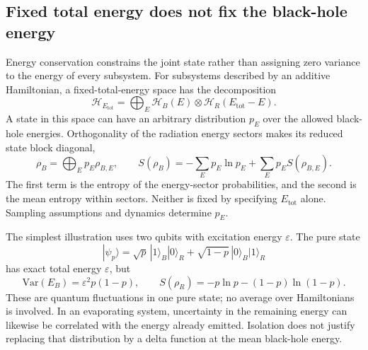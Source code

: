 \documentclass[11pt,letterpaper]{article}
\theoremstyle{plain}
\theoremstyle{definition}
\theoremstyle{remark}
\newcommand{\Hcal}{\mathcal{H}}
\newcommand{\Var}{\text{Var}}
\begin{document}
\subsection{Fixed total energy does not fix the black-hole energy}
\label{subsec14:energy_constraints}

Energy conservation constrains the joint state rather than assigning
zero variance to the energy of every subsystem. For subsystems described
by an additive Hamiltonian, a fixed-total-energy space has the
decomposition
\begin{equation}
 \Hcal_{E_{\mathrm{tot}}}
 =\bigoplus_E\Hcal_B(E)\otimes
                  \Hcal_R(E_{\mathrm{tot}}-E).
 \label{eq14:energy_shell}
\end{equation}
A state in this space can have an arbitrary distribution $p_E$ over
the allowed black-hole energies. Orthogonality of the radiation energy
sectors makes its reduced state block diagonal,
\begin{equation}
 \rho_B=\bigoplus_Ep_E\rho_{B,E},\qquad
 S(\rho_B)=-\sum_Ep_E\ln p_E+
                     \sum_Ep_E S(\rho_{B,E}).
 \label{eq14:sector_entropy}
\end{equation}
The first term is the entropy of the energy-sector probabilities, and
the second is the mean entropy within sectors. Neither is fixed by
specifying $E_{\mathrm{tot}}$ alone. Sampling assumptions and dynamics
determine $p_E$.

The simplest illustration uses two qubits with excitation energy
$\varepsilon$. The pure state
\begin{equation}
 |\psi_p\rangle
 =\sqrt p\,|1\rangle_B|0\rangle_R
  +\sqrt{1-p}\,|0\rangle_B|1\rangle_R
 \label{eq14:fixed_energy_example}
\end{equation}
has exact total energy $\varepsilon$, but
\begin{equation}
 \Var(E_B)=\varepsilon^2p(1-p),\qquad
 S(\rho_R)=-p\ln p-(1-p)\ln(1-p).
 \label{eq14:fixed_energy_variance}
\end{equation}
These are quantum fluctuations in one pure state; no average over
Hamiltonians is involved. In an evaporating system, uncertainty in the
remaining energy can likewise be correlated with the energy already
emitted. Isolation does not justify replacing that distribution by a
delta function at the mean black-hole energy.
\end{document}
